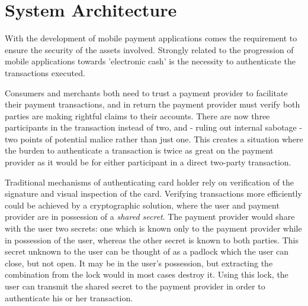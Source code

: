 \section{System Architecture}
\label{chap:hardware_architecture}
With the development of mobile payment applications comes the requirement to ensure the security of the assets involved.
Strongly related to the progression of mobile applications towards 'electronic cash' is the necessity to authenticate the transactions executed. \cite{herzberg2003payments}


Consumers and merchants both need to trust a payment provider to facilitate their payment transactions, and in return the payment provider must verify both parties are making rightful claims to their accounts.
There are now three participants in the transaction instead of two, and - ruling out internal sabotage - two points of potential malice rather than just one.
This creates a situation where the burden to authenticate a transaction is twice as great on the payment provider as it would be for either participant in a direct two-party transaction.

Traditional mechanisms of authenticating card holder rely on verification of the signature and visual inspection of the card.
Verifying transactions more efficiently could be achieved by a cryptographic solution, where the user and payment provider are in possession of a \textit{shared secret}.
The payment provider would share with the user two secrets: one which is known only to the payment provider while in possession of the user, whereas the other secret is known to both parties.
This secret unknown to the user can be thought of as a padlock which the user can close, but not open.
It may be in the user's possession, but extracting the combination from the lock would in most cases destroy it.
Using this lock, the user can transmit the shared secret to the payment provider in order to authenticate his or her transaction.



